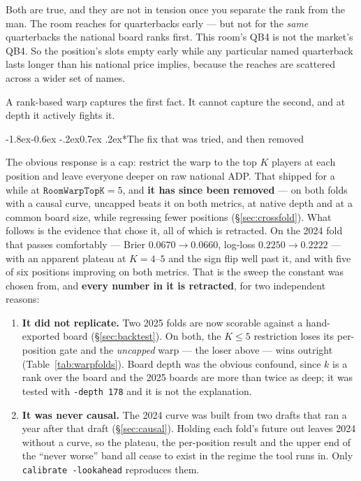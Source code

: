 \documentclass[10pt,a4paper]{article}
\makeatletter
\theoremstyle{plain}
\theoremstyle{definition}
\theoremstyle{remark}
\newcommand{\code}[1]{\texttt{\small #1}}
\renewcommand\subsubsection{\@startsection{subsubsection}{3}{\z@}%
  {-1.8ex\@plus -0.6ex \@minus -.2ex}{0.7ex \@plus .2ex}{\normalfont\normalsize\bfseries}}
\makeatother
\begin{document}
Both are true, and they are not in tension once you separate the rank from the man. The
room reaches for quarterbacks early --- but not for the \emph{same} quarterbacks the
national board ranks first. This room's QB4 is not the market's QB4. So the position's
slots empty early while any particular named quarterback lasts longer than his national
price implies, because the reaches are scattered across a wider set of names.

A rank-based warp captures the first fact. It cannot capture the second, and at depth it
actively fights it.

\subsubsection*{The fix that was tried, and then removed}

The obvious response is a cap: restrict the warp to the top $K$ players at each position and
leave everyone deeper on raw national ADP. That shipped for a while at
$\texttt{RoomWarpTopK} = 5$, and \textbf{it has since been removed} --- on both folds with a
causal curve, uncapped beats it on both metrics, at native depth and at a common board size,
while regressing fewer positions (\S\ref{sec:crossfold}). What follows is the evidence that
chose it, all of which is retracted. On the 2024 fold that passes comfortably --- Brier
$0.0670 \to 0.0660$, log-loss $0.2250 \to 0.2222$ --- with an apparent plateau at $K = 4$--$5$
and the sign flip well past it, and with five of six positions improving on both metrics.
That is the sweep the constant was chosen from, and \textbf{every number in it is
retracted}, for two independent reasons:

\begin{enumerate}
\item \textbf{It did not replicate.} Two 2025 folds are now scorable against a
hand-exported board (\S\ref{sec:backtest}). On both, the $K \le 5$ restriction loses its
per-position gate and the \emph{uncapped} warp --- the loser above --- wins outright
(Table~\ref{tab:warpfolds}). Board depth was the obvious confound, since $k$ is a rank over
the board and the 2025 boards are more than twice as deep; it was tested with
\code{-depth 178} and it is not the explanation.
\item \textbf{It was never causal.} The 2024 curve was built from two drafts that ran a
year after that draft (\S\ref{sec:causal}). Holding each fold's future out leaves 2024
without a curve, so the plateau, the per-position result and the upper end of the
``never worse'' band all cease to exist in the regime the tool runs in. Only
\code{calibrate -lookahead} reproduces them.
\end{enumerate}
\end{document}
